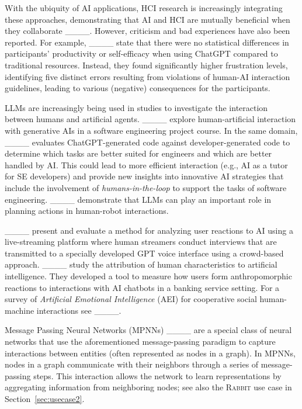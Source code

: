 With the ubiquity of AI applications, HCI research is increasingly integrating these approaches, demonstrating that AI and HCI are mutually beneficial when they collaborate ____.
%
However, criticism and bad experiences have also been reported. 
For example, ____ state that there were no statistical differences in participants' productivity or self-efficacy when using ChatGPT compared to traditional resources.
Instead, they found significantly higher frustration levels, identifying five distinct errors resulting from violations of human-AI interaction guidelines, leading to various (negative) consequences for the participants.

LLMs are increasingly being used in studies to investigate the interaction between humans and artificial agents. 
____ explore human-artificial interaction with generative AIs in a software engineering project course.
In the same domain, ____ evaluates ChatGPT-generated code against developer-generated code to determine which tasks are better suited for engineers and which are better handled by AI. This could lead to more efficient interaction (e.g., AI as a tutor for SE developers) and provide new insights into innovative AI strategies that include the involvement of {\em humans-in-the-loop} to support the tasks of software engineering.
%
____ demonstrate that LLMs can play an important role in planning actions in human-robot interactions.

____ present and evaluate a method for analyzing user reactions to AI using a live-streaming platform where human streamers conduct interviews that are transmitted to a specially developed GPT voice interface using a crowd-based approach.
____ study the attribution of human characteristics to artificial intelligence. They developed a tool to measure how users form anthropomorphic reactions to interactions with AI chatbots in a banking service setting. 
For a survey of {\em Artificial Emotional Intelligence} (AEI) for cooperative social human-machine interactions see ____.

Message Passing Neural Networks (MPNNs) ____ are a special class of neural networks that use the aforementioned message-passing paradigm to capture interactions between entities (often represented as nodes in a graph).
In MPNNs, nodes in a graph communicate with their neighbors through a series of message-passing steps. This interaction allows the network to learn representations by aggregating information from neighboring nodes; see also the \textsc{Rabbit} use case in Section~\ref{sec:usecase2}.


